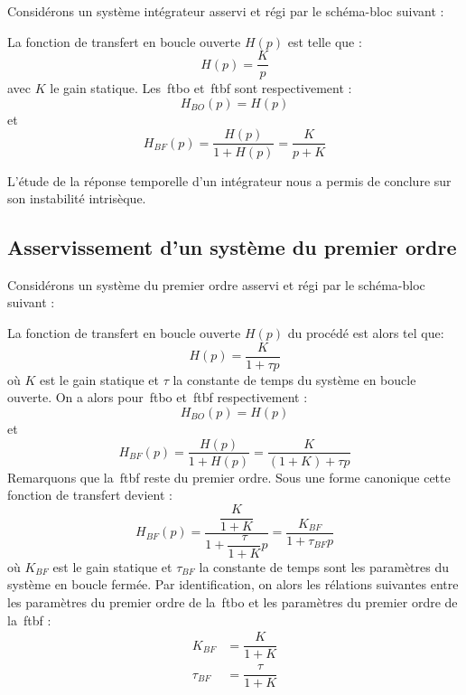 Considérons un système intégrateur asservi et régi par le schéma-bloc suivant :
\begin{center}
\end{center}

La fonction de transfert en boucle ouverte $H(p)$ est telle que :
$$
H(p)=\dfrac{K}{p}
$$
avec $K$ le gain statique. 
Les~\gls{ftbo} et~\gls{ftbf} sont respectivement :
$$
H_{BO}(p)=H(p)
$$
et
$$
H_{BF}(p)=\dfrac{H(p)}{1+H(p)}=\dfrac{K}{p+K}
$$

L'étude de la réponse temporelle d'un intégrateur nous a permis de conclure sur 
son instabilité intrisèque.

\subsection{Asservissement d'un système du premier ordre}

Considérons un système du premier ordre asservi et régi par le schéma-bloc suivant :
\begin{center}
\end{center}
La fonction de transfert en boucle ouverte $H(p)$ du procédé est alors tel que:
$$
H(p)=\dfrac{K}{1+\tau p}
$$
où $K$ est le gain statique et $\tau$ la constante de temps du système en boucle ouverte.
On a alors pour~\gls{ftbo} et~\gls{ftbf} respectivement :
$$
H_{BO}(p)=H(p)
$$
et 
$$
H_{BF}(p)=\dfrac{H(p)}{1+H(p)}=\dfrac{K}{(1+K)+\tau p}
$$
Remarquons que la~\gls{ftbf} reste du premier ordre. Sous une forme canonique
cette fonction de transfert devient :
$$
H_{BF}(p)=\dfrac{\dfrac{K}{1+K}}{1+\dfrac{\tau}{1+K}p}=\dfrac{K_{BF}}{1+\tau_{BF} p}
$$
où $K_{BF}$ est le gain statique et $\tau_{BF}$ la constante de temps sont les 
paramètres du système en boucle fermée.
Par identification, on alors les rélations suivantes entre les paramètres du premier ordre 
de la~\gls{ftbo} et les paramètres du premier ordre de la~\gls{ftbf} :
\begin{align*}
       K_{BF}&=\dfrac{K}{1+K}\\
    \tau_{BF}&=\dfrac{\tau}{1+K}
\end{align*}

